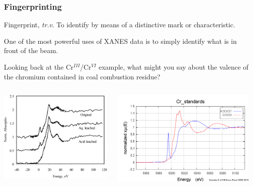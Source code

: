 \documentclass[10pt, xcolor=x11names, compress]{beamer}
\begin{document}
\begin{frame}
  \frametitle{Fingerprinting}
  \begin{block}{Fingerprint, \textit{tr.v.}}
    To identify by means of a distinctive mark or characteristic.
  \end{block}

  \small

  One of the most powerful uses of XANES data is to simply identify
  what is in front of the beam.

  Looking back at the Cr$^{III}$/Cr$^{VI}$ example, what might you say
  about the valence of the chromium contained in coal combustion residue?

  \begin{columns}[T]
    \begin{column}{0.45\linewidth}
      \begin{center}
        \includegraphics[width=0.8\linewidth]{images/cr_coal.png}
      \end{center}
    \end{column}
    \begin{column}{0.45\linewidth}
      \begin{center}
        \includegraphics[width=0.9\linewidth]{images/Cr/Cr.png}

\end{center}
\end{column}
\end{columns}
\end{frame}
\end{document}
